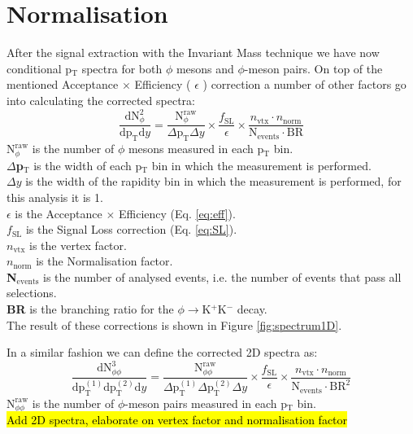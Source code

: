 \section{Normalisation}
\label{sec:Normalisation}
After the signal extraction with the Invariant Mass technique we have now conditional p$_{\text{T}}$ spectra for both $\phi$ mesons and $\phi$-meson pairs. On top of the mentioned Acceptance $\times$ Efficiency ( $\epsilon$ ) correction a number of other factors go into calculating the corrected spectra:
\begin{equation}
\frac{\text{dN}^2_{\phi}}{\text{dp}_{\text{T}}\text{d}y} = \frac{\text{N}_{\phi}^{\text{raw}}}{\Delta\text{p}_{\text{T}}\Delta y} \times \frac{f_{\text{SL}}}{\epsilon} \times \frac{n_{\text{vtx}}\cdot n_{\text{norm}}}{\text{N}_{\text{events}}\cdot \text{BR}}
\label{eq:1Dcorr}
\end{equation}
\textbf{$\text{N}_{\phi}^{\text{raw}}$} is the number of $\phi$ mesons measured in each p$_{\text{T}}$ bin.\\
\textbf{$\Delta$p$_{\text{T}}$} is the width of each p$_{\text{T}}$ bin in which the measurement is performed.\\
\textbf{$\Delta y$} is the width of the rapidity bin in which the measurement is performed, for this analysis it is 1.\\
\textbf{$\epsilon$} is the Acceptance $\times$ Efficiency (Eq. \ref{eq:eff}).\\
\textbf{$f_{\text{SL}}$} is the Signal Loss correction (Eq. \ref{eq:SL}).\\
\textbf{$n_{\text{vtx}}$} is the vertex factor.\\
\textbf{$n_{\text{norm}}$} is the Normalisation factor.\\
\textbf{N$_{\text{events}}$} is the number of analysed events, i.e. the number of events that pass all selections.\\
\textbf{BR} is the branching ratio for the $\phi \to$K$^+$K$^-$ decay.\\
\indent The result of these corrections is shown in Figure \ref{fig:spectrum1D}.

\indent In a similar fashion we can define the corrected 2D spectra as:
\begin{equation}
\frac{\text{dN}^3_{\phi\phi}}{\text{dp}^{(1)}_{\text{T}}\text{dp}^{(2)}_{\text{T}}\text{d}y} = \frac{\text{N}_{\phi\phi}^{\text{raw}}}{\Delta\text{p}^{(1)}_{\text{T}}\Delta\text{p}^{(2)}_{\text{T}}\Delta y} \times \frac{f_{\text{SL}}}{\epsilon} \times \frac{n_{\text{vtx}}\cdot n_{\text{norm}}}{\text{N}_{\text{events}}\cdot \text{BR}^2}
\label{eq:2Dcorr}
\end{equation}
\textbf{$\text{N}_{\phi\phi}^{\text{raw}}$} is the number of $\phi$-meson pairs measured in each p$_{\text{T}}$ bin.\\
\hl{Add 2D spectra, elaborate on vertex factor and normalisation factor}